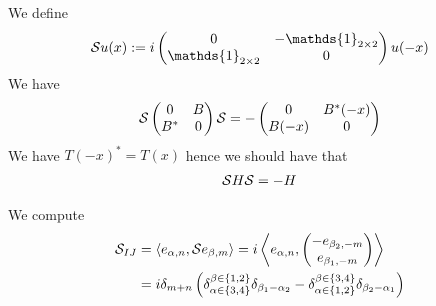 \documentclass[11pt,a4paper,reqno,french,tikz]{amsart}
\newcommand{\pa}[1]{\left( #1 \right)} %
\newcommand{\acs}[1]{\left\{ #1 \right\}} %
\newcommand{\ps}[1]{\left< #1 \right>} %
\newcommand{\mat}[1]{\begin{pmatrix} #1 \end{pmatrix}} %
\def\1{{\mathds{1}}}
\def\1{{\mathds{1}}}
\begin{document}
We define
\begin{align*}
\cS u(x) := i \mat{0 & -\1_{2\times 2} \\ \1_{2\times 2} & 0} u(-x)
\end{align*}
We have
\begin{align*}
\cS \mat{0 & B \\ B^* & 0} \cS = -\mat{0 & B^*(-x) \\ B(-x) & 0}
\end{align*}
We have $T(-x)^* = T(x)$ hence we should have that
\begin{align*}
\mathcal{S} H \mathcal{S} = - H
\end{align*}

We compute
\begin{align*}
	\cS_{IJ} &= \ps{e_{\alpha,n},\cS e_{\beta,m}} = i \ps{e_{\alpha,n}, \mat{-e_{\beta_2,-m} \\ e_{\beta_1,-m}}} \\
&= i \delta_{m+n} \pa{\delta_{\alpha \in \acs{3,4}}^{\beta \in \acs{1,2}} \delta_{\beta_1-\alpha_2} -\delta_{\alpha \in \acs{1,2}}^{\beta \in \acs{3,4}}\delta_{\beta_2-\alpha_1}}
\end{align*}
\end{document}

